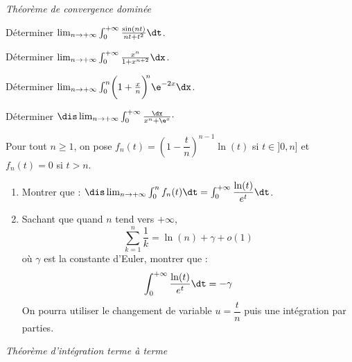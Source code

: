 \documentclass[a4paper,10pt]{report}
\begin{document}
\medskip

\begin{center}
\textit{{ {\large Théorème de convergence dominée}}}
\end{center}

\medskip

\begin{Exercice}{} Déterminer $\lim_{n \to + \infty} \int_{0}^{ + \infty} \frac{\sin(nt)}{nt + t^{2}} \dt$.
\end{Exercice}



\begin{Exercice}{} Déterminer $\lim_{n \rightarrow + \infty}\int_{0}^{ + \infty} \frac{x^{n}}{1 + x^{n + 2}} \dx$.
\end{Exercice}





\begin{Exercice}{} Déterminer $\lim_{n \to + \infty} \int_{0}^{n} \biggl( 1 + \frac{x}{n} \biggr)^{\!\!n} \e^{ - 2x} \dx$.
\end{Exercice}



 \begin{Exercice}{} Déterminer $\dis \lim_{n \rightarrow + \infty} \int_{0}^{ + \infty} \frac{\dx}{x^{n} + \e^{x}} \cdot$
 \end{Exercice}
 


\begin{Exercice}{}
Pour tout $n \geq 1$, on pose $f_n(t) = \left( 1 - \dfrac{t}{n} \right)^{n-1}\ln(t)$ si $t \in ]0,n]$ et $f_n(t)=0$ si $t>n$.
\begin{enumerate}
\item Montrer que : $\dis \lim_{n \rightarrow + \infty} \int_{0}^n f_n(t) \dt = \int_{0}^{+ \infty} \dfrac{\ln(t)}{e^t} \dt$.
\item Sachant que quand $n$ tend vers $+ \infty$,
$$ \sum_{k=1}^n \dfrac{1}{k} = \ln(n)+ \gamma + o(1)$$
où $\gamma$ est la constante d'Euler, montrer que :
$$ \int_{0}^{+ \infty} \dfrac{\ln(t)}{e^t} \dt = - \gamma$$
On pourra utiliser le changement de variable $u=\dfrac{t}{n}$ puis une intégration par parties.
\end{enumerate}
\end{Exercice}



\medskip

\begin{center}
\textit{{ {\large Théorème d'intégration terme à terme}}}
\end{center}
\end{document}
